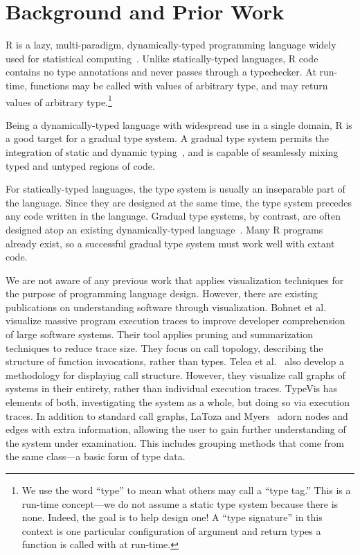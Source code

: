 \documentclass[review]{vgtc}                 %
\newcommand{\typevis}{{\sc TypeVis}\xspace}
\begin{document}

\section{Background and Prior Work}

R is a lazy, multi-paradigm, dynamically-typed programming language
widely used for statistical computing~\cite{morandat:2012}.
Unlike statically-typed languages,
R code contains no type annotations
and never passes through a typechecker.
At run-time,
functions may be called with values of arbitrary type,
and may return values of arbitrary type.\footnote{
  We use the word ``type'' to mean what others may call a ``type tag.''
  This is a run-time concept---we do not assume a static type system
  because there is none. Indeed, the goal is to help design one!
  A ``type signature'' in this context is one particular configuration
  of argument and return types a function is called with at run-time.
}

Being a dynamically-typed language
with widespread use in a single domain,
R is a good target for a gradual type system.
A gradual type system permits the integration of
static and dynamic typing~\cite{siek:2006,tobin-hochstadt:2006},
and is capable of seamlessly mixing typed and untyped regions of code.

For statically-typed languages, the type system is usually
an inseparable part of the language. Since they are designed
at the same time, the type system precedes any code written
in the language.
Gradual type systems, by contrast, are often designed atop
an existing dynamically-typed language~\cite{tobin-hochstadt:2016}.
Many R programs already exist,
so a successful gradual type system must
work well with extant code.

We are not aware of any previous work that applies
visualization techniques for the purpose of programming language design.
However, there are existing publications on understanding
software through visualization.
Bohnet et al.~\cite{bohnet:2009} visualize massive program execution traces
to improve developer comprehension of large software systems.
Their tool applies pruning and summarization techniques to reduce trace size.
They focus on call topology,
describing the structure of function invocations,
rather than types.
Telea et al.~\cite{telea:2009} also develop a methodology for displaying call structure.
However, they visualize call graphs of systems in their entirety,
rather than individual execution traces.
\typevis has elements of both,
investigating the system as a whole,
but doing so via execution traces.
In addition to standard call graphs,
LaToza and Myers~\cite{latoza:2011} adorn nodes and edges with extra information,
allowing the user to gain further understanding of the system
under examination.
This includes grouping methods that come from the same class---a
basic form of type data.
\end{document}

